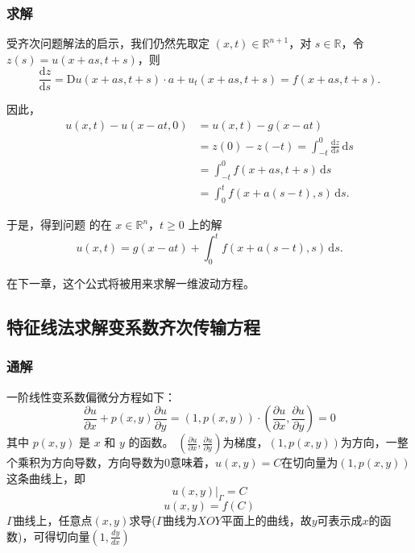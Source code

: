 \documentclass[12pt,a4paper]{article}
\numberwithin{subsection}{section}
\numberwithin{subsubsection}{subsection}
\theoremstyle{plain}
\theoremstyle{definition}
\theoremstyle{remark}
\begin{document}
\subsubsection{求解}
	受齐次问题解法的启示，我们仍然先取定 \((x, t) \in \mathbb{R}^{n+1}\)，对 \(s \in \mathbb{R}\)，令 \(z(s) = u(x + a s, t + s)\)，则
		\begin{equation}
	\frac{\mathrm{d}z}{\mathrm{d}s} = \mathrm{D}u(x + a s, t + s) \cdot a + u_t(x + a s, t + s) = f(x + a s, t + s).
		\end{equation}
	
	因此，
	\begin{equation}
	\begin{aligned}
		u(x, t) -	u(x-at,0)&= u(x, t)-g(x - a t) \\
		&= z(0) - z(-t) = \int_{-t}^0 \frac{\mathrm{d}z}{\mathrm{d}s} \, \mathrm{d}s \\
		&= \int_{-t}^0 f(x + a s, t + s) \, \mathrm{d}s \\
		&= \int_0^t f(x + a (s - t), s) \, \mathrm{d}s.
	\end{aligned}
\end{equation}
	
	于是，得到问题 的在 \(x \in \mathbb{R}^n\)，\(t \geq 0\) 上的解
	\begin{equation}\label{eq:非齐次解1}
		u(x, t) = g(x - a t) + \int_0^t f(x + a (s - t), s) \, \mathrm{d}s.
	\end{equation}
	
	在下一章，这个公式将被用来求解一维波动方程。
	
	
	
	\subsection{特征线法求解变系数齐次传输方程} 
	\subsubsection{通解} 
	一阶线性变系数偏微分方程如下：
	\begin{equation}\label{eq:pde_original2}
		\frac{\partial u}{\partial x} + p(x,y) \frac{\partial u}{\partial y}=(1, p(x, y)) \cdot \left( \frac{\partial u}{\partial x}, \frac{\partial u}{\partial y} \right) = 0 
	\end{equation}
	其中 $p(x, y)$ 是 $x$ 和 $y$ 的函数。
	$\left( \frac{\partial u}{\partial x}, \frac{\partial u}{\partial y} \right)$为梯度，$(1, p(x, y))$为方向，一整个乘积为方向导数，方向导数为0意味着，$u(x, y)=C$在切向量为$(1, p(x, y))$这条曲线上，即
	\begin{equation}
		u(x,y)|_{\Gamma} = C
	\end{equation}
	\begin{equation}
		u(x,y) =  f(C)
	\end{equation}
	$\Gamma$曲线上，任意点$(x, y)$求导($\Gamma$曲线为$XOY$平面上的曲线，故$y$可表示成$x$的函数)，可得切向量$(1,\frac{dy}{dx})$
	
\end{document}
